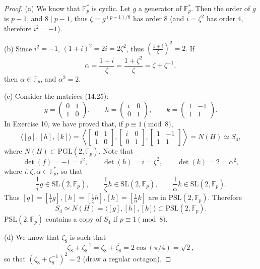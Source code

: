 \documentclass[11pt,a4paper]{article}
\newcommand{\F}{\mathbb{F}}
\begin{document}
{{}
\begin{proof}
\item[(a)] We know that $\F_p^*$ is cyclic. Let $g$ a generator of $\F_p^*$. Then the order of $g$ is $p-1$, and $8 \mid p-1$, thus $\zeta = g^{(p-1)/8}$ has order $8$ (and $i = \zeta^2$ has order $4$, therefore $i^2 = -1$).
\item[(b)] Since $i^2 = -1$, $(1+i)^2 = 2i = 2 \zeta^2$, thus $\left(\frac{1+i}{\zeta}\right)^2 = 2$. If 
$$\alpha = \frac{1+i}{\zeta} = \frac{1+\zeta^2}{\zeta} = \zeta + \zeta^{-1},$$ then $\alpha \in \F_p$, and $\alpha^2 = 2$.
\item[(c)] Consider the matrices (14.25):
$$g = \begin{pmatrix} 0 & 1\\1 & 0\end{pmatrix},\qquad  h = \begin{pmatrix} i & 0\\0 & 1 \end{pmatrix},\qquad   k= \begin{pmatrix} 1 & -1\\1 & 1 \end{pmatrix}.$$
In Exercise 10, we have proved that, if $p\equiv 1 \pmod 8$,
$$\langle [g],[h],[k]\rangle = \left \langle
\begin{bmatrix} 0 & 1\\1 & 0\end{bmatrix}, \begin{bmatrix} i & 0\\0 & 1 \end{bmatrix},  \begin{bmatrix} 1 & -1\\1 & 1 \end{bmatrix}
 \right \rangle = N(H) \simeq S_4,
$$
where $N(H) \subset \mathrm{PGL}(2,\F_p)$.
Note that 
$$\det(f) = -1 = i^2,\qquad \det(h) = i = \zeta^2,\qquad \det(k) = 2 = \alpha^2, $$
where $i,\zeta, \alpha \in \F_p^*$, so that
$$\frac{1}{i} g \in \mathrm{SL}(2,\F_p), \qquad \frac{1}{\zeta} h  \in \mathrm{SL}(2,\F_p), \qquad \frac{1}{\alpha} k  \in \mathrm{SL}(2,\F_p).$$
Thus $[g] = [\frac{1}{i} g], [h] = [ \frac{1}{\zeta} h], [k] = [ \frac{1}{\alpha} k]$ are in $\mathrm{PSL}(2,\F_p)$. Therefore
$$S_4 \simeq N(H) = \langle [g],[h],[k]\rangle \subset \mathrm{PSL}(2,\F_p).$$
$\mathrm{PSL}(2,\F_p)$ contains a copy of $S_4$ if $p\equiv 1 \pmod 8$.
\item[(d)] We know that $\zeta_8$ is such that 
$$\zeta_8 + \zeta_8^{-1} = \zeta_8 + \overline{\zeta_8} = 2 \cos(\pi/4) = \sqrt{2},$$
so that $(\zeta_8 + \zeta_8^{-1})^2 = 2$ (draw a regular octagon).


\end{proof}}
\end{document}
